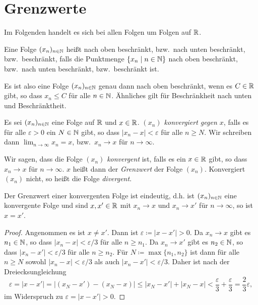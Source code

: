 \documentclass[a4paper,10pt]{article}
\begin{document}
\section{Grenzwerte}
Im Folgenden handelt es sich bei allen Folgen um Folgen auf $\mathbb{R}$.


\begin{defi}
 Eine Folge $(x_n)_{n \in \mathbb{N}}$ heißt nach oben beschränkt, bzw.\ nach unten beschränkt, bzw.\ beschränkt, falls die Punktmenge $\{x_n \mid n \in \mathbb{N}\}$ nach oben beschränkt, bzw.\ nach unten beschränkt, bzw.\ beschränkt ist.
\end{defi}


Es ist also eine Folge $(x_n)_{n \in \mathbb{N}}$ genau dann nach oben beschränkt, wenn es $C \in \mathbb{R}$ gibt, so dass $x_n \leq C$ für alle $n \in \mathbb{N}$. Ähnliches gilt für Beschränkheit nach unten und Beschränktheit.


\begin{defi}\label{defi: Definition Konvergenz}
 Es sei $(x_n)_{n \in \mathbb{N}}$ eine Folge auf $\mathbb{R}$ und $x \in \mathbb{R}$. \emph{$(x_n)$ konvergiert gegen $x$}, falls es für alle $\varepsilon > 0$ ein $N \in \mathbb{N}$ gibt, so dass $|x_n-x| < \varepsilon$ für alle $n \geq N$. Wir schreiben dann $\lim_{n \to \infty} x_n = x$, bzw.\ $x_n \to x$ für $n \to \infty$.
 
 Wir sagen, dass die Folge $(x_n)$ \emph{konvergent} ist, falls es ein $x \in \mathbb{R}$ gibt, so dass $x_n \to x$ für $n \to \infty$. $x$ heißt dann der \emph{Grenzwert} der Folge $(x_n)$. Konvergiert $(x_n)$ nicht, so heißt die Folge \emph{divergent}.
\end{defi}


\begin{prop}
 Der Grenzwert einer konvergenten Folge ist eindeutig, d.h. ist $(x_n)_{n \in \mathbb{N}}$ eine konvergente Folge und sind $x, x' \in \mathbb{R}$ mit $x_n \to x$ und $x_n \to x'$ für $n \to \infty$, so ist $x = x'$.
\end{prop}
\begin{proof}
 Angenommen es ist $x \neq x'$. Dann ist $\varepsilon \coloneqq |x-x'| > 0$. Da $x_n \to x$ gibt es $n_1 \in \mathbb{N}$, so dass $|x_n - x| < \varepsilon/3$ für alle $n \geq n_1$. Da $x_n \to x'$ gibt es $n_2 \in \mathbb{N}$, so dass $|x_n - x'| < \varepsilon/3$ für alle $n \geq n_2$. Für $N \coloneqq \max \{n_1, n_2\}$ ist dann für alle $n \geq N$ sowohl $|x_n - x| < \varepsilon/3$ als auch $|x_n - x'| < \varepsilon/3$. Daher ist nach der Dreiecksungleichung
 \[
  \varepsilon
  = |x - x'|
  = |(x_N - x') - (x_N - x)|
  \leq |x_N - x'| + |x_N - x|
  < \frac{\varepsilon}{3} + \frac{\varepsilon}{3}
  = \frac{2}{3} \varepsilon,
 \]
 im Widerspruch zu $\varepsilon = |x - x'| > 0$.
\end{proof}
\end{document}
